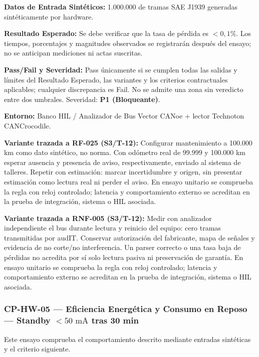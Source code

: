 \par\noindent \textbf{Datos de Entrada Sintéticos:} 1.000.000 de tramas SAE J1939 generadas sintéticamente por hardware.\par
\par\noindent \textbf{Resultado Esperado:} Se debe verificar que la tasa de pérdida es $< 0{,}1\%$. Los tiempos, porcentajes y magnitudes observados se registrarán después del ensayo; no se anticipan mediciones ni actas suscritas.\par
\par\noindent \textbf{Pass/Fail y Severidad:} Pass únicamente si se cumplen todas las salidas y límites del Resultado Esperado, las variantes y los criterios contractuales aplicables; cualquier discrepancia es Fail. No se admite una zona sin veredicto entre dos umbrales. Severidad: \textbf{P1 (Bloqueante)}.\par
\par\noindent \textbf{Entorno:} Banco HIL / Analizador de Bus Vector CANoe + lector Technoton CANCrocodile.\par

\par\noindent \textbf{Variante trazada a RF-025 (S3/T-12):} Configurar mantenimiento a 100.000 km como dato sintético, no norma. Con odómetro real de 99.999 y 100.000 km esperar ausencia y presencia de aviso, respectivamente, enviado al sistema de talleres. Repetir con estimación: marcar incertidumbre y origen, sin presentar estimación como lectura real ni perder el aviso. En ensayo unitario se comprueba la regla con reloj controlado; latencia y comportamiento externo se acreditan en la prueba de integración, sistema o HIL asociada.\par

\par\noindent \textbf{Variante trazada a RNF-005 (S3/T-12):} Medir con analizador independiente el bus durante lectura y reinicio del equipo: cero tramas transmitidas por audIT. Conservar autorización del fabricante, mapa de señales y evidencia de no corte/no interferencia. Un parser correcto o una tasa baja de pérdidas no acredita por sí solo lectura pasiva ni preservación de garantía. En ensayo unitario se comprueba la regla con reloj controlado; latencia y comportamiento externo se acreditan en la prueba de integración, sistema o HIL asociada.\par


\subsubsection*{CP-HW-05 — Eficiencia Energética y Consumo en Reposo — Standby $< 50\text{ mA}$ tras 30 min}\label{sec:9-cp-hw-05}
Este ensayo comprueba el comportamiento descrito mediante entradas sintéticas y el criterio siguiente.

